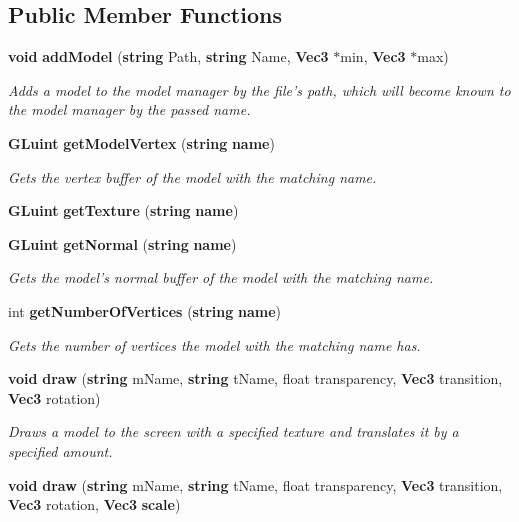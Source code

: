 \subsection*{Public Member Functions}
\begin{DoxyCompactItemize}
\item 
{\bf void} {\bf add\+Model} ({\bf string} Path, {\bf string} Name, {\bf Vec3} $\ast$min, {\bf Vec3} $\ast$max)
\begin{DoxyCompactList}\small\item\em Adds a model to the model manager by the file's path, which will become known to the model manager by the passed name. \end{DoxyCompactList}\item 
{\bf G\+Luint} {\bf get\+Model\+Vertex} ({\bf string} {\bf name})
\begin{DoxyCompactList}\small\item\em Gets the vertex buffer of the model with the matching name. \end{DoxyCompactList}\item 
{\bf G\+Luint} {\bf get\+Texture} ({\bf string} {\bf name})
\item 
{\bf G\+Luint} {\bf get\+Normal} ({\bf string} {\bf name})
\begin{DoxyCompactList}\small\item\em Gets the model's normal buffer of the model with the matching name. \end{DoxyCompactList}\item 
int {\bf get\+Number\+Of\+Vertices} ({\bf string} {\bf name})
\begin{DoxyCompactList}\small\item\em Gets the number of vertices the model with the matching name has. \end{DoxyCompactList}\item 
{\bf void} {\bf draw} ({\bf string} m\+Name, {\bf string} t\+Name, float transparency, {\bf Vec3} transition, {\bf Vec3} rotation)
\begin{DoxyCompactList}\small\item\em Draws a model to the screen with a specified texture and translates it by a specified amount. \end{DoxyCompactList}\item 
{\bf void} {\bf draw} ({\bf string} m\+Name, {\bf string} t\+Name, float transparency, {\bf Vec3} transition, {\bf Vec3} rotation, {\bf Vec3} {\bf scale})
\end{DoxyCompactItemize}
